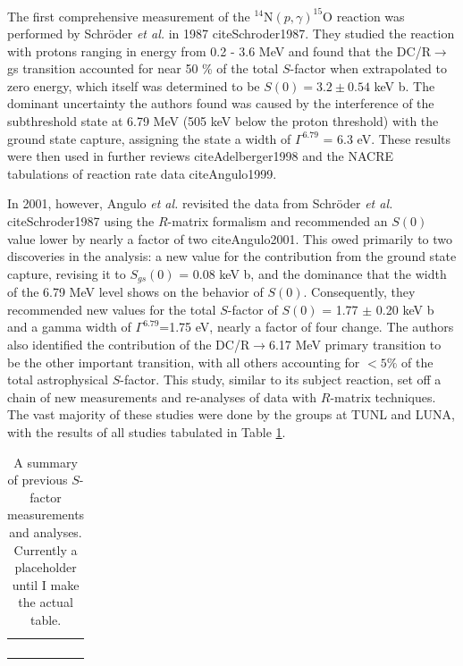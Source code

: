 The first comprehensive measurement of the $^{14}$N$\left( p,\gamma \right) ^{15}$O reaction was performed by Schr{\"o}der \textit{et al.} in 1987 cite{Schroder1987}. They studied the reaction with protons ranging in energy from 0.2 - 3.6 MeV and found that the DC/R$\rightarrow$gs transition accounted for near 50 \% of the total $S$-factor when extrapolated to zero energy, which itself was determined to be $S(0) = 3.2 \pm 0.54$ keV b. The dominant uncertainty the authors found was caused by the interference of the subthreshold state at 6.79 MeV (505 keV below the proton threshold) with the ground state capture, assigning the state a width of $\Gamma^{6.79}$ = 6.3 eV. These results were then used in further reviews cite{Adelberger1998} and the NACRE tabulations of reaction rate data cite{Angulo1999}. 

In 2001, however, Angulo \textit{et al.} revisited the data from Schr{\"o}der \textit{et al.} cite{Schroder1987} using the $R$-matrix formalism and recommended an $S(0)$ value lower by nearly a factor of two cite{Angulo2001}. This owed primarily to two discoveries in the analysis: a new value for the contribution from the ground state capture, revising it to $S_{gs}(0)$ = 0.08 keV b, and the dominance that the width of the 6.79 MeV level shows on the behavior of $S(0)$. Consequently, they recommended new values for the total $S$-factor of $S(0)$ = 1.77 $\pm$ 0.20 keV b and a gamma width of $\Gamma^{6.79}$=1.75 eV, nearly a factor of four change. The authors also identified the contribution of the DC/R$\rightarrow$6.17 MeV primary transition to be the other important transition, with all others accounting for $< 5\%$ of the total astrophysical $S$-factor. This study, similar to its subject reaction, set off a chain of new measurements and re-analyses of data with $R$-matrix techniques. The vast majority of these studies were done by the groups at TUNL and LUNA, with the results of all studies tabulated in Table \ref{table: s factors}.

\begin{table}[]
\begin{tabular}{lllll}
 &  &  &  &  \\
 &  &  &  &  \\
 &  &  &  &  \\
 &  &  &  & 
\end{tabular}
\label{table: s factors}
\caption{A summary of previous $S$-factor measurements and analyses. Currently a placeholder until I make the actual table.}
\end{table}


